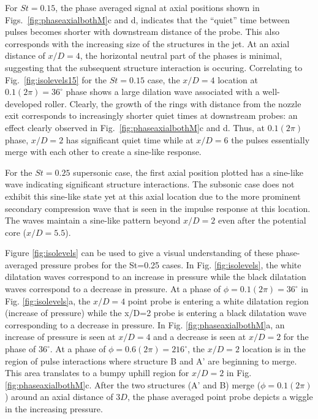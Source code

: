 \documentclass[english]{aiaa-tc}
\begin{document}
For $St=0.15$, the phase averaged signal at axial positions shown in
Figs.~\ref{fig:phaseaxialbothM}c and d, indicates that the ``quiet'' time between
pulses becomes shorter with downstream distance of the probe.  This
also corresponds with the increasing size of the structures in the jet. At an
axial distance of $x/D=4$, the horizontal neutral part of the phases
is minimal, suggesting that the subsequent structure interaction is occuring.  Correlating to
Fig.~\ref{fig:isolevels15} for the $St=0.15$ case, the $x/D=4$ location at 
$0.1(2\pi)=36^\circ$ phase shows a large dilation wave associated with
a well-developed roller. Clearly, the growth of the rings with
distance from the nozzle exit corresponds to increasingly shorter
quiet times at downstream probes: an effect clearly observed in
Fig.~\ref{fig:phaseaxialbothM}c and d.  Thus, at $0.1(2\pi)$ phase, $x/D=2$ has
significant quiet time while at $x/D=6$ the pulses essentially merge
with each other to create a sine-like response.

For the $St=0.25$ supersonic case, the first axial position plotted has a sine-like wave indicating significant structure interactions. The subsonic case does not exhibit this sine-like state yet at this axial location due to the more prominent secondary compression wave that is seen in the impulse response at this location. The waves maintain a sine-like pattern beyond $x/D=2$ even after the potential core ($x/D=5.5$). 

Figure \ref{fig:isolevels} can be used to give a visual understanding of these phase-averaged pressure probes for the St=0.25 cases. In Fig. \ref{fig:isolevels}, the white dilatation waves correspond to an increase in pressure while the black dilatation waves correspond to a decrease in pressure. At a phase of $\phi=0.1(2\pi)=36^\circ$ in Fig. \ref{fig:isolevels}a, the $x/D=4$ point probe is entering a white dilatation region (increase of pressure) while the x/D=2 probe is entering a black dilatation wave corresponding to a decrease in pressure. In Fig. \ref{fig:phaseaxialbothM}a, an increase of pressure is seen at $x/D=4$ and a decrease is seen at $x/D=2$ for the phase of $36^\circ$. At a phase of $\phi=0.6(2\pi)=216^\circ$, the $x/D=2$ location is in the region of pulse interactions where structure B and A' are beginning to merge. This area translates to a bumpy uphill region for $x/D=2$ in Fig. \ref{fig:phaseaxialbothM}c. After the two structures (A' and B) merge ($\phi=0.1(2\pi)$) around an axial distance of $3D$, the phase averaged point probe depicts a wiggle in the increasing pressure. 
\end{document}
